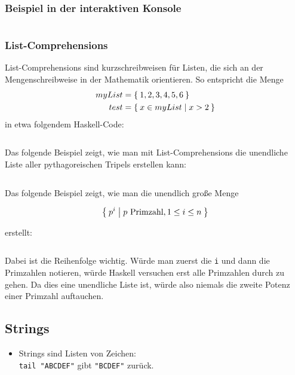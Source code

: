 \subsubsection{Beispiel in der interaktiven Konsole}
\inputminted[numbersep=5pt, tabsize=4]{haskell}{scripts/haskell/listenoperationen.sh}

\subsubsection{List-Comprehensions}%
List-Comprehensions sind kurzschreibweisen für Listen, die sich an 
der Mengenschreibweise in der Mathematik orientieren. So entspricht
die Menge
\begin{align*}
    myList &= \Set{1,2,3,4,5,6}\\
    test   &= \Set{x \in myList | x > 2}
\end{align*}
in etwa folgendem Haskell-Code:
\inputminted[numbersep=5pt, tabsize=4]{haskell}{scripts/haskell/list-comprehensions.sh}

\begin{beispiel}
    Das folgende Beispiel zeigt, wie man mit List-Comprehensions die unendliche
    Liste aller pythagoreischen Tripels erstellen kann:

    \inputminted[numbersep=5pt, tabsize=4]{haskell}{scripts/haskell/pythagorean-triples.hs}
\end{beispiel}

\begin{beispiel}
    Das folgende Beispiel zeigt, wie man die unendlich große Menge

    \[\Set{p^i | p \text{ Primzahl}, 1 \leq i \leq n}\]

    erstellt:

    \inputminted[numbersep=5pt, tabsize=4]{haskell}{scripts/haskell/primepowers.hs}

    Dabei ist die Reihenfolge wichtig. Würde man zuerst die \verb+i+ und dann
    die Primzahlen notieren, würde Haskell versuchen erst alle Primzahlen durch
    zu gehen. Da dies eine unendliche Liste ist, würde also niemals die zweite
    Potenz einer Primzahl auftauchen.
\end{beispiel}

\subsection{Strings}
\begin{itemize}
    \item Strings sind Listen von Zeichen:\\
          \texttt{tail "ABCDEF"} gibt \texttt{"BCDEF"} zurück.
\end{itemize}

